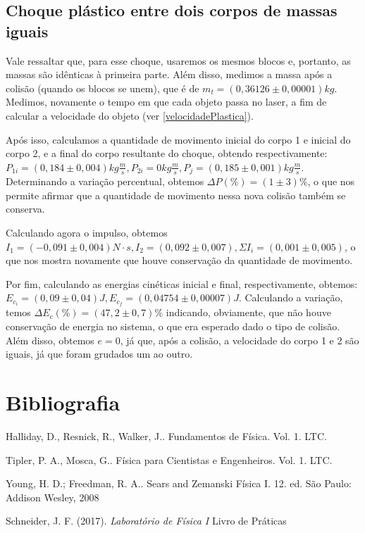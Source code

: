 \documentclass[12pt, twoside]{article}
\begin{document}
\subsection{Choque plástico entre dois corpos de massas iguais}

Vale ressaltar que, para esse choque, usaremos os mesmos blocos e, portanto, as massas são idênticas à primeira parte. Além disso, medimos a massa após a colisão (quando os blocos se unem), que é de $m_t = (0,36126\pm0,00001)kg$. Medimos, novamente o tempo em que cada objeto passa no laser, a fim de calcular a velocidade do objeto (ver \ref{velocidadePlastica}).

Após isso, calculamos a quantidade de movimento inicial do corpo 1 e inicial do corpo 2, e a final do corpo resultante do choque, obtendo respectivamente: $P_{1i} = (0,184\pm0,004)kg\frac{m}{s}, P_{2i}=0kg\frac{m}{s}, P_j=(0,185\pm0,001)kg\frac{m}{s}$. Determinando a variação percentual, obtemos $\Delta P(\%) = (1\pm3)\%$, o que nos permite afirmar que a quantidade de movimento nessa nova colisão também se conserva.

Calculando agora o impulso, obtemos $I_1 = (-0,091\pm0,004)N\cdot s, I_2 = (0,092\pm0,007), \Sigma I_i = (0,001\pm0,005)$, o que nos mostra novamente que houve conservação da quantidade de movimento.

Por fim, calculando as energias cinéticas inicial e final, respectivamente, obtemos: $E_{c_i} = (0,09\pm0,04)J, E_{c_f} = (0,04754\pm0,00007)J$. Calculando a variação, temos $\Delta E_c(\%) = (47,2 \pm 0,7)\%$ indicando, obviamente, que não houve conservação de energia no sistema, o que era esperado dado o tipo de colisão. Além disso, obtemos $e = 0$, já que, após a colisão, a velocidade do corpo 1 e 2 são iguais, já que foram grudados um ao outro.

\section{Bibliografia}

\begin{thebibliography}{3}
Halliday, D., Resnick, R., Walker, J.. Fundamentos de Física. Vol. 1. LTC.

Tipler, P. A., Mosca, G.. Física para Cientistas e Engenheiros. Vol. 1. LTC.

Young, H. D.; Freedman, R. A.. Sears and Zemanski Física I. 12. ed. São
Paulo: Addison Wesley, 2008


Schneider, J. F. (2017). \emph{Laboratório de Física I} Livro de Práticas
\end{thebibliography}  
\end{document}
